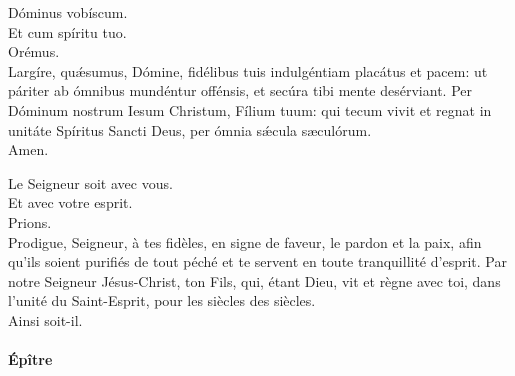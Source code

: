 \documentclass[twoside]{article}
\begin{document}
\begin{paracol}{2}

\vv Dóminus vobíscum.\\
\rr Et cum spíritu tuo.\\
\vv Orémus.\\
Largíre, quǽsumus, Dómine, fidélibus tuis indulgéntiam placátus et pacem: ut páriter ab ómnibus mundéntur offénsis, et secúra tibi mente desérviant.
Per Dóminum nostrum Iesum Christum, Fílium tuum: qui tecum vivit et regnat in unitáte Spíritus Sancti Deus, per ómnia sǽcula sæculórum.\\
\rr Amen.

\switchcolumn

\vv Le Seigneur soit avec vous. \\
\rr Et avec votre esprit.\\
\vv Prions.\\
Prodigue, Seigneur, à tes fidèles, en signe de faveur, le pardon et la paix, afin qu'ils soient purifiés de tout péché et te servent en toute tranquillité d'esprit.
Par notre Seigneur Jésus-Christ, ton Fils, qui, étant Dieu, vit et règne avec toi, dans l’unité du Saint-Esprit, pour les siècles des siècles.\\
\rr Ainsi soit-il.

\end{paracol}

\newpage

\paragraph{Épître}
\end{document}
